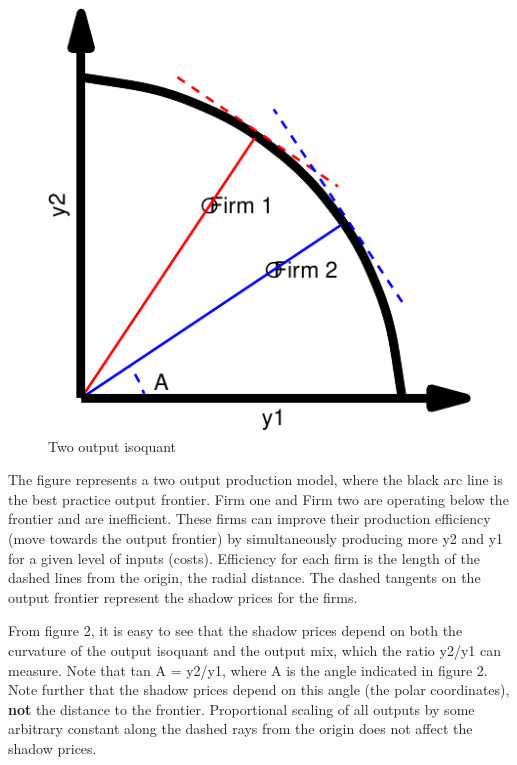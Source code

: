 \documentclass[
  10pt,
]{article}
\begin{document}
\begin{figure}[H]

{\centering \includegraphics{figures/paper-isoquant-1} 

}

\caption{ Two output isoquant}\label{fig:isoquant}
\end{figure}

\begin{footnotesize} 
The figure represents a two output production model, where the black arc line is the best practice output frontier. Firm one and Firm two are operating below the frontier and are inefficient. These firms can improve their production efficiency (move towards the output frontier) by simultaneously producing more y2 and y1 for a given level of inputs (costs). Efficiency for each firm is the length of the dashed lines from the origin, the radial distance.  The dashed tangents on the output frontier represent the shadow prices for the firms.
\end{footnotesize}

From figure 2, it is easy to see that the shadow prices depend on both
the curvature of the output isoquant and the output mix, which the ratio
y2/y1 can measure. Note that tan A = y2/y1, where A is the angle
indicated in figure 2. Note further that the shadow prices depend on
this angle (the polar coordinates), \textbf{not} the distance to the
frontier. Proportional scaling of all outputs by some arbitrary constant
along the dashed rays from the origin does not affect the shadow prices.
\end{document}

